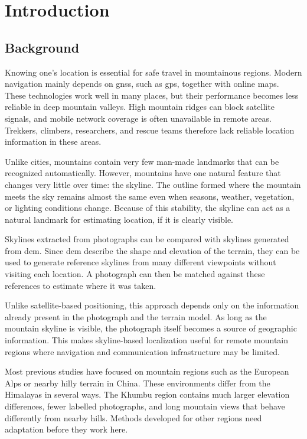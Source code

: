 \chapter{Introduction}

\section{Background}

Knowing one's location is essential for safe travel in mountainous regions. Modern navigation mainly depends on \Gls{gnss}, such as \Gls{gps}, together with online maps. These technologies work well in many places, but their performance becomes less reliable in deep mountain valleys. High mountain ridges can block satellite signals, and mobile network coverage is often unavailable in remote areas. Trekkers, climbers, researchers, and rescue teams therefore lack reliable location information in these areas.

Unlike cities, mountains contain very few man-made landmarks that can be recognized automatically. However, mountains have one natural feature that changes very little over time: the skyline. The outline formed where the mountain meets the sky remains almost the same even when seasons, weather, vegetation, or lighting conditions change. Because of this stability, the skyline can act as a natural landmark for estimating location, if it is clearly visible.

Skylines extracted from photographs can be compared with skylines generated from \Gls{dem}. Since \Gls{dem} describe the shape and elevation of the terrain, they can be used to generate reference skylines from many different viewpoints without visiting each location. A photograph can then be matched against these references to estimate where it was taken.

Unlike satellite-based positioning, this approach depends only on the information already present in the photograph and the terrain model. As long as the mountain skyline is visible, the photograph itself becomes a source of geographic information. This makes skyline-based localization useful for remote mountain regions where navigation and communication infrastructure may be limited.

Most previous studies have focused on mountain regions such as the European Alps or nearby hilly terrain in China. These environments differ from the Himalayas in several ways. The Khumbu region contains much larger elevation differences, fewer labelled photographs, and long mountain views that behave differently from nearby hills. Methods developed for other regions need adaptation before they work here.

